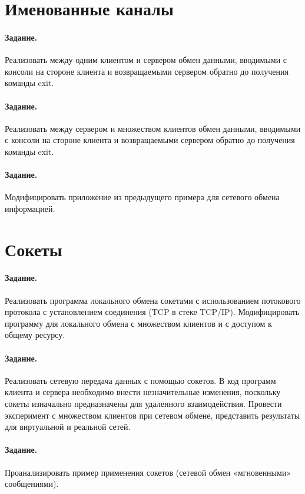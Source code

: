 \section{Именованные каналы}

\paragraph{Задание.} Реализовать между одним клиентом и сервером обмен данными, вводимыми с консоли на стороне клиента и возвращаемыми сервером обратно до получения команды exit.

\paragraph{Задание.} Реализовать между сервером и множеством клиентов обмен данными, вводимыми с консоли на стороне клиента и возвращаемыми сервером обратно до получения команды exit.

\paragraph{Задание.} Модифицировать приложение из предыдущего примера для сетевого обмена информацией.

\section{Сокеты}

\paragraph{Задание.} Реализовать программа локального обмена сокетами с использованием потокового протокола с установлением соединения (TCP в стеке TCP/IP). Модифицировать программу для локального обмена с множеством клиентов и с доступом к общему ресурсу.

\paragraph{Задание.}  Реализовать сетевую передача данных с помощью сокетов. В код программ клиента и сервера необходимо внести незначительные изменения, поскольку сокеты изначально предназначены для удаленного взаимодействия. Провести эксперимент с множеством клиентов при сетевом обмене, представить результаты для виртуальной и реальной сетей.

\paragraph{Задание.} Проанализировать пример применения сокетов (сетевой обмен «мгновенными» сообщениями).

